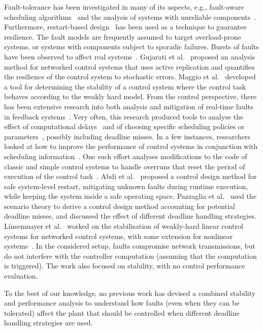 Fault-tolerance has been investigated in many of its aspects, e.g., fault-aware scheduling algorithms~\cite{Rowe:2013, Buttazzo:2000b} and the analysis of systems with unreliable components~\cite{Teich:2015}.
Furthermore, restart-based design~\cite{Caccamo:2017a, Caccamo:2018} has been used as a technique to guarantee resilience.
The fault models are frequently assumed to target overload-prone systems, or systems with components subject to sporadic failures.
Bursts of faults have been observed to affect real systems~\cite{Phan:2015, Vreman:2020}.
Gujarati et al.~\cite{Gujarati:2018} proposed an analysis method for networked control systems that uses active replication and quantifies the resilience of the control system to stochastic errors.
Maggio et al.~\cite{Maggio:2020} developed a tool for determining the stability of a control system where the control task behaves according to the weakly hard model.
From the control perspective, there has been extensive research into both analysis and mitigation of real-time faults in feedback systems~\cite{Ramanathan:1997, Chakraborty:2014b, Chakraborty:2018}.
Very often, this research produced tools to analyse the effect of computational delays~\cite{Cervin:2019} and of choosing specific scheduling policies or parameters~\cite{Palopoli:2000, Cervin:2005}, possibly including deadline misses.
In a few instances, researchers looked at how to improve the performance of control systems in conjunction with scheduling information~\cite{Buttazzo:2007}.
One such effort analyses modifications to the code of classic and simple control systems to handle overruns that reset the period of execution of the control task~\cite{Pazzaglia:2021}.
Abdi et al.~\cite{Caccamo:2017b} proposed a control design method for safe system-level restart, mitigating unknown faults during runtime execution, while keeping the system inside a safe operating space.
Pazzaglia et al.~\cite{Pazzaglia:2019} used the scenario theory to derive a control design method accounting for potential deadline misses, and discussed the effect of different deadline handling strategies.
Linsenmayer et al.~\cite{Linsenmayer:2020} worked on the stabilisation of weakly-hard linear control systems for networked control systems, with some extension for nonlinear systems~\cite{Hertneck:2019}.
In the considered setup, faults compromise network transmissions, but do not interfere with the controller computation (assuming that the computation is triggered).
The work also focused on stability, with no control performance evaluation.

To the best of our knowledge, no previous work has devised a combined stability and performance analysis to understand how faults (even when they can be tolerated) affect the plant that should be controlled when different deadline handling strategies are used.
